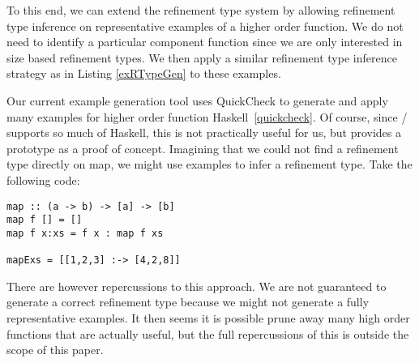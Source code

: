 To this end, we can extend the refinement type system by allowing refinement type inference on representative examples of a higher order function.
We do not need to identify a particular component function since we are only interested in size based refinement types.
We then apply a similar refinement type inference strategy as in Listing \ref{exRTypeGen} to these examples.

Our current example generation tool uses QuickCheck to generate and apply many examples for higher order function Haskell~\ref{quickcheck}.
Of course, since \lhask/ supports so much of Haskell, this is not practically useful for us, but provides a prototype as a proof of concept.
Imagining that we could not find a refinement type directly on map, we might use examples to infer a refinement type. Take the following code:

\begin{lstlisting}[numbers=none]
map :: (a -> b) -> [a] -> [b]
map f [] = [] 
map f x:xs = f x : map f xs

mapExs = [[1,2,3] :-> [4,2,8]]
\end{lstlisting}

There are however repercussions to this approach. We are not guaranteed to generate a correct refinement type because we might not generate a fully representative examples. It then seems it is possible prune away many high order functions that are actually useful, but the full repercussions of this is outside the scope of this paper.


